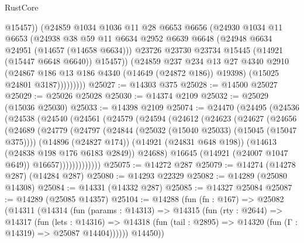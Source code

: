 \begin{lexlean}{RustCore}
\begin{coremodule}
                    @15457))
                (@24859
                  @1034
                  @1036
                  @11
                  @28
                  @6653
                  @6656
                  (@24930
                    @1034
                    @11
                    @6653
                    (@24938
                      @38
                      @59
                      @11
                      @6634
                      @2952
                      @6639
                      @6648
                      (@24948 @6634 @24951 (@14657 (@14658 @6634)))
                      @23726
                      @23730
                      @23734
                      @15445
                      (@14921 (@15447 @6648 @6640))
                      @15457))
                  (@24859
                    @237
                    @234
                    @13
                    @27
                    @4340
                    @2910
                    (@24867 @186 @13 @186 @4340 (@14649 (@24872 @186)) @19398)
                    (@15025 @24801 @3187)))))))))
@25027 := @14303 @375
@25028 := @14500 @25027
@25029 := @25026 @25028
@25030 := @14374 @2109
@25032 := @25029 (@15036 @25030)
@25033 := @14398 @2109
@25074 := @24470
    (@24495
      (@24536
        (@24538
          (@24540
            (@24561
              (@24579
                (@24594
                  (@24612
                    (@24623
                      (@24627
                        (@24656
                          (@24689
                            (@24779
                              (@24797
                                (@24844 (@25032 (@15040 @25033) (@15045 (@15047 @375))))
                                (@14896 (@24827 @174))
                                (@14921 (@24831 @648 @198))
                                (@14613 (@24838 @198 @176 @6183 @2849))
                                @24688)
                              @16645
                              (@14921 (@24007 @1047 @649))
                              @16657)))))))))))))
@25075 := @14272 @287
@25079 := @14274 (@14278 @287) (@14284 @287)
@25080 := @14293 @22329
@25082 := @14289 (@25080 @14308)
@25084 := @14331 (@14332 @287)
@25085 := @14327 @25084
@25087 := @14289 (@25085 @14357)
@25104 := @14288
    (fun (fn : @167) =>
    @25082
      (@14311
        (@14314
          (fun (params : @14313) =>
          @14315
            (fun (rty : @2644) =>
            @14317
              (fun (lets : @14316) =>
              @14318 (fun (tail : @2895) => @14320 (fun (Γ : @14319) => @25087 @14404))))))
        @14450))

\end{coremodule}
\end{lexlean}
